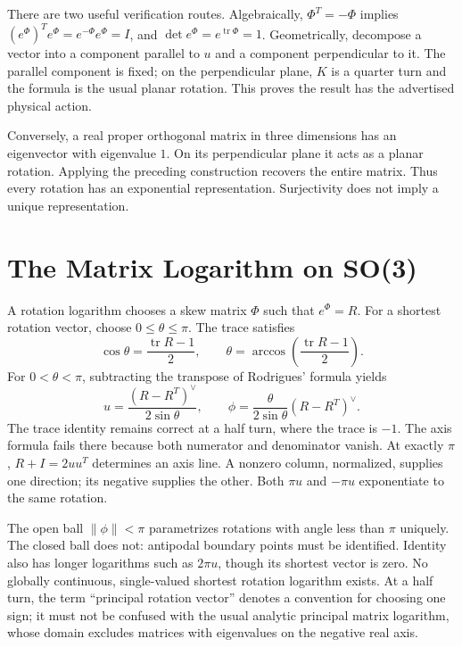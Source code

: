 There are two useful verification routes. Algebraically, $\Phi^T=-\Phi$ implies $(e^\Phi)^Te^\Phi=e^{-\Phi}e^\Phi=I$, and $\det e^\Phi=e^{\operatorname{tr}\Phi}=1$. Geometrically, decompose a vector into a component parallel to $u$ and a component perpendicular to it. The parallel component is fixed; on the perpendicular plane, $K$ is a quarter turn and the formula is the usual planar rotation. This proves the result has the advertised physical action.

Conversely, a real proper orthogonal matrix in three dimensions has an eigenvector with eigenvalue $1$. On its perpendicular plane it acts as a planar rotation. Applying the preceding construction recovers the entire matrix. Thus every rotation has an exponential representation. Surjectivity does not imply a unique representation.

\section{The Matrix Logarithm on SO(3)}
\label{sec:matrix_log_so3}

A rotation logarithm chooses a skew matrix $\Phi$ such that $e^\Phi=R$. For a shortest rotation vector, choose $0\leq\theta\leq\pi$. The trace satisfies
\begin{equation}
 \cos\theta=\frac{\operatorname{tr}R-1}{2},\qquad
 \theta=\arccos\left(\frac{\operatorname{tr}R-1}{2}\right).
 \label{eq:angle_from_trace}
\end{equation}
For $0<\theta<\pi$, subtracting the transpose of Rodrigues' formula yields
\begin{equation}
 u=\frac{(R-R^T)^\vee}{2\sin\theta},\qquad
 \phi=\frac{\theta}{2\sin\theta}(R-R^T)^\vee.
 \label{eq:axis_from_skew}
\end{equation}
The trace identity remains correct at a half turn, where the trace is $-1$. The axis formula fails there because both numerator and denominator vanish. At exactly $\pi$, $R+I=2uu^T$ determines an axis line. A nonzero column, normalized, supplies one direction; its negative supplies the other. Both $\pi u$ and $-\pi u$ exponentiate to the same rotation.

The open ball $\|\phi\|<\pi$ parametrizes rotations with angle less than $\pi$ uniquely. The closed ball does not: antipodal boundary points must be identified. Identity also has longer logarithms such as $2\pi u$, though its shortest vector is zero. No globally continuous, single-valued shortest rotation logarithm exists. At a half turn, the term ``principal rotation vector'' denotes a convention for choosing one sign; it must not be confused with the usual analytic principal matrix logarithm, whose domain excludes matrices with eigenvalues on the negative real axis.

